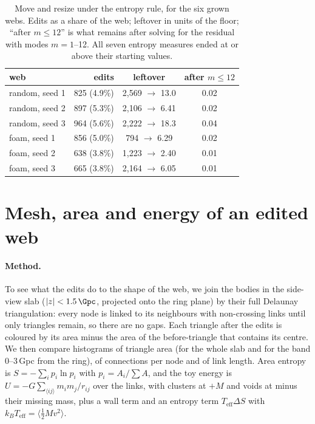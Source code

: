 \documentclass[aps,prd,twocolumn,nofootinbib,superscriptaddress,floatfix]{revtex4-2}
\begin{document}
\begin{table}[tbp]
\caption{Move and resize under the entropy rule, for the six grown webs. Edits as a share of the web; leftover in units of the floor; ``after $m\leq12$'' is what remains after solving for the residual with modes $m=1$--12. All seven entropy measures ended at or above their starting values.}
\label{tab:entropy}
\footnotesize
\begin{ruledtabular}
\begin{tabular}{lrcc}
web & edits & leftover & after $m\leq12$\\
\midrule
random, seed 1 & 825 (4.9\%) & 2,569 $\to$ 13.0 & 0.02\\
random, seed 2 & 897 (5.3\%) & 2,106 $\to$ 6.41 & 0.02\\
random, seed 3 & 964 (5.6\%) & 2,222 $\to$ 18.3 & 0.04\\
foam, seed 1 & 856 (5.0\%) & 794 $\to$ 6.29 & 0.02\\
foam, seed 2 & 638 (3.8\%) & 1,223 $\to$ 2.40 & 0.01\\
foam, seed 3 & 665 (3.8\%) & 2,164 $\to$ 6.05 & 0.01\\
\end{tabular}
\end{ruledtabular}
\end{table}

\section{Mesh, area and energy of an edited web}\label{sec:mesh}
\paragraph*{Method.} To see what the edits do to the shape of the web, we join the bodies in the side-view slab ($|z|<\SI{1.5}{\Gpc}$, projected onto the ring plane) by their full Delaunay triangulation: every node is linked to its neighbours with non-crossing links until only triangles remain, so there are no gaps. Each triangle after the edits is coloured by its area minus the area of the before-triangle that contains its centre. We then compare histograms of triangle area (for the whole slab and for the band 0--3\,Gpc from the ring), of connections per node and of link length. Area entropy is $S=-\sum_i p_i\ln p_i$ with $p_i=A_i/\sum A$, and the toy energy is $U=-G\sum_{\langle ij\rangle}m_im_j/r_{ij}$ over the links, with clusters at $+M$ and voids at minus their missing mass, plus a wall term and an entropy term $T_\mathrm{eff}\Delta S$ with $k_BT_\mathrm{eff}=\langle\frac12Mv^2\rangle$.
\end{document}
